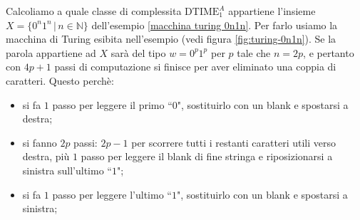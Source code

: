 \begin{exam}
Calcoliamo a quale classe di complessita 
$\mathrm{DTIME}_1^{A}$
appartiene
l'insieme $X=\{ 0^n1^n \, | \, n \in \mathbb N\}$ dell'esempio \ref{macchina turing 0n1n}.
Per farlo usiamo la macchina di Turing esibita nell'esempio (vedi figura \ref{fig:turing-0n1n}).
Se la parola appartiene ad $X$ sarà del tipo
$w = 0^p 1^p$ per $p$ tale che $n = 2p$, e pertanto con $4p + 1$ passi di computazione si finisce per aver eliminato una
coppia di caratteri. 
Questo perchè:
\begin{itemize}
    \item si fa $1$ passo per leggere il primo ``$0$", sostituirlo con un blank e spostarsi a destra;
    
    \item si fanno $2p$ passi: $2p-1$ per scorrere tutti i restanti caratteri utili verso destra, più $1$ passo per leggere il blank di fine stringa e riposizionarsi a sinistra sull'ultimo ``$1$";

    \item si fa $1$ passo per leggere l'ultimo ``$1$", sostituirlo con un blank e spostarsi a sinistra;
    

\end{itemize}
\end{exam}

